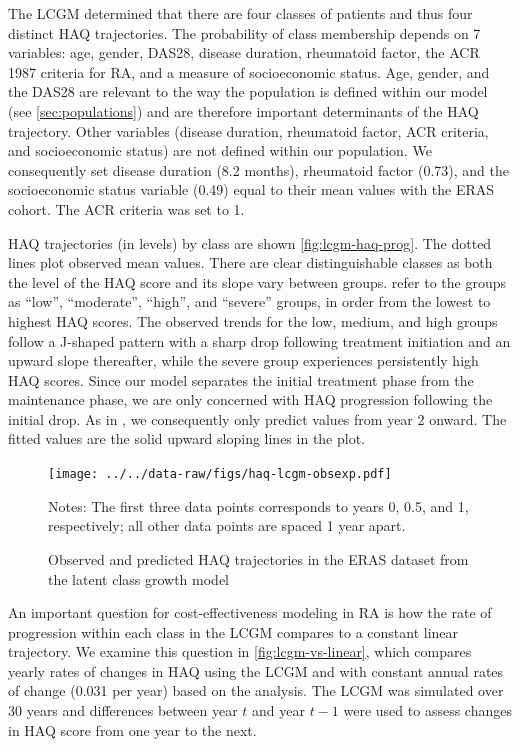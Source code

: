 \documentclass[11pt,final,fleqn]{article}\usepackage[]{graphicx}\usepackage[]{color}
\theoremstyle{plain}
\begin{document}
The \citet{norton2014health} LCGM determined that there are four classes of patients and thus four distinct HAQ trajectories. The probability of class membership depends on 7 variables: age, gender, DAS28, disease duration, rheumatoid factor, the ACR 1987 criteria for RA, and a measure of socioeconomic status. Age, gender, and the DAS28 are relevant to the way the population is defined within our model (see \autoref{sec:populations}) and are therefore important determinants of the HAQ trajectory. Other variables (disease duration, rheumatoid factor, ACR criteria, and socioeconomic status) are not defined within our population. We consequently set disease duration (8.2 months), rheumatoid factor (0.73), and the socioeconomic status variable (0.49) equal to their mean values with the ERAS cohort. The ACR criteria was set to 1. 

HAQ trajectories (in levels) by class are shown \autoref{fig:lcgm-haq-prog}. The dotted lines plot observed mean values. There are clear distinguishable classes as both the level of the HAQ score and its slope vary between groups. \citet{norton2014health} refer to the groups as ``low'', ``moderate'', ``high'', and ``severe'' groups, in order from the lowest to highest HAQ scores. The observed trends for the low, medium, and high groups follow a J-shaped pattern with a sharp drop following treatment initiation and an upward slope thereafter, while the severe group experiences persistently high HAQ scores. Since our model separates the initial treatment phase from the maintenance phase, we are only concerned with HAQ progression following the initial drop. As in \citet{stevenson2016adalimumab}, we consequently only predict values from year 2 onward. The fitted values are the solid upward sloping lines in the plot.  
\begin{figure}[H]
\centering
\texttt{[image: ../../data-raw/figs/haq-lcgm-obsexp.pdf]}
\caption{Observed and predicted HAQ trajectories in the ERAS dataset from the latent class growth model}\label{fig:lcgm-haq-prog}
\begin{minipage}{\linewidth}
\footnotesize
Notes: The first three data points corresponds to years 0, 0.5, and 1, respectively; all other data points are spaced 1 year apart.
\end{minipage}
\end{figure}



An important question for cost-effectiveness modeling in RA is how the rate of progression within each class in the LCGM compares to a constant linear trajectory. We examine this question in \autoref{fig:lcgm-vs-linear}, which compares yearly rates of changes in HAQ using the LCGM and with constant annual rates of change (0.031 per year) based on the \citet{wolfe2010loss} analysis. The LCGM was simulated over 30 years and differences between year $t$ and year $t-1$ were used to assess changes in HAQ score from one year to the next.  
\end{document}
